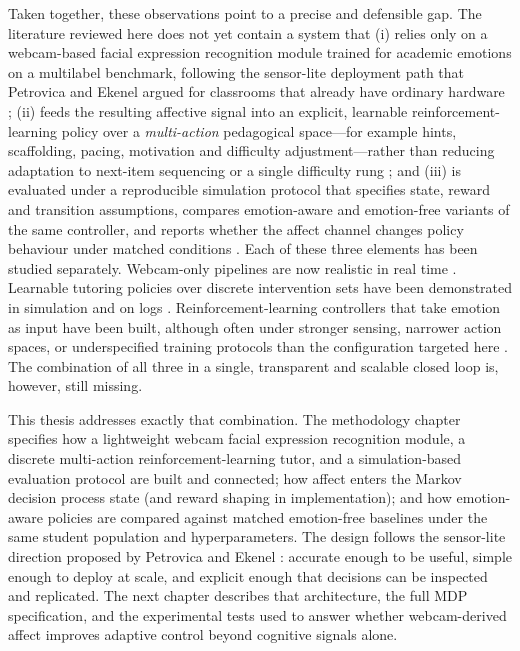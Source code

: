 Taken together, these observations point to a precise and defensible gap. The literature reviewed here does not yet contain a system that (i) relies only on a webcam-based facial expression recognition module trained for academic emotions on a multilabel benchmark, following the sensor-lite deployment path that Petrovica and Ekenel argued for classrooms that already have ordinary hardware \cite{petrovica_emotion_2016,aly_comprehensive_2025,liu_dynamic_2026}; (ii) feeds the resulting affective signal into an explicit, learnable reinforcement-learning policy over a \emph{multi-action} pedagogical space---for example hints, scaffolding, pacing, motivation and difficulty adjustment---rather than reducing adaptation to next-item sequencing or a single difficulty rung \cite{perez_emotions_2024,fu_integrating_2025,kuling_ken_2025,kong_real-time_2025}; and (iii) is evaluated under a reproducible simulation protocol that specifies state, reward and transition assumptions, compares emotion-aware and emotion-free variants of the same controller, and reports whether the affect channel changes policy behaviour under matched conditions \cite{azoulay_adaptive_2021,perez_emotions_2024,weitekamp_tutorgym_2025}. Each of these three elements has been studied separately. Webcam-only pipelines are now realistic in real time \cite{aly_comprehensive_2025,liu_dynamic_2026}. Learnable tutoring policies over discrete intervention sets have been demonstrated in simulation and on logs \cite{axak_adaptive_nodate,fu_integrating_2025,kong_real-time_2025}. Reinforcement-learning controllers that take emotion as input have been built, although often under stronger sensing, narrower action spaces, or underspecified training protocols than the configuration targeted here \cite{perez_emotions_2024,govea_implementation_2024,gong_design_2025}. The combination of all three in a single, transparent and scalable closed loop is, however, still missing.

This thesis addresses exactly that combination. The methodology chapter specifies how a lightweight webcam facial expression recognition module, a discrete multi-action reinforcement-learning tutor, and a simulation-based evaluation protocol are built and connected; how affect enters the Markov decision process state (and reward shaping in implementation); and how emotion-aware policies are compared against matched emotion-free baselines under the same student population and hyperparameters. The design follows the sensor-lite direction proposed by Petrovica and Ekenel \cite{petrovica_emotion_2016}: accurate enough to be useful, simple enough to deploy at scale, and explicit enough that decisions can be inspected and replicated. The next chapter describes that architecture, the full MDP specification, and the experimental tests used to answer whether webcam-derived affect improves adaptive control beyond cognitive signals alone.